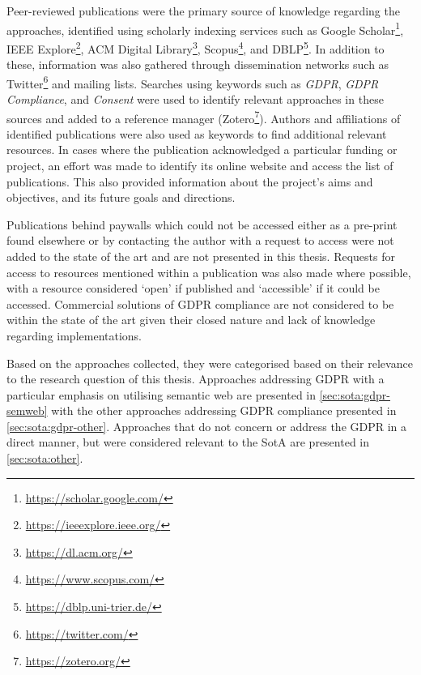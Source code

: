 Peer-reviewed publications were the primary source of knowledge regarding the approaches, identified using scholarly indexing services such as Google Scholar\footnote{\url{https://scholar.google.com/}}, IEEE Explore\footnote{\url{https://ieeexplore.ieee.org/}}, ACM Digital Library\footnote{\url{https://dl.acm.org/}}, Scopus\footnote{\url{https://www.scopus.com/}}, and DBLP\footnote{\url{https://dblp.uni-trier.de/}}.
In addition to these, information was also gathered through dissemination networks such as Twitter\footnote{\url{https://twitter.com/}} and mailing lists.
Searches using keywords such as \textit{GDPR}, \textit{GDPR Compliance}, and \textit{Consent} were used to identify relevant approaches in these sources and added to a reference manager (Zotero\footnote{\url{https://zotero.org/}}).
Authors and affiliations of identified publications were also used as keywords to find additional relevant resources.
In cases where the publication acknowledged a particular funding or project, an effort was made to identify its online website and access the list of publications. This also provided information about the project's aims and objectives, and its future goals and directions. 

Publications behind paywalls which could not be accessed either as a pre-print found elsewhere or by contacting the author with a request to access were not added to the state of the art and are not presented in this thesis. Requests for access to resources mentioned within a publication was also made where possible, with a resource considered `open' if published and `accessible' if it could be accessed. Commercial solutions of GDPR compliance are not considered to be within the state of the art given their closed nature and lack of knowledge regarding implementations.

Based on the approaches collected, they were categorised based on their relevance to the research question of this thesis.
Approaches addressing GDPR with a particular emphasis on utilising semantic web are presented in \autoref{sec:sota:gdpr-semweb} with the other approaches addressing GDPR compliance presented in \autoref{sec:sota:gdpr-other}.
Approaches that do not concern or address the GDPR in a direct manner, but were considered relevant to the SotA are presented in \autoref{sec:sota:other}.


